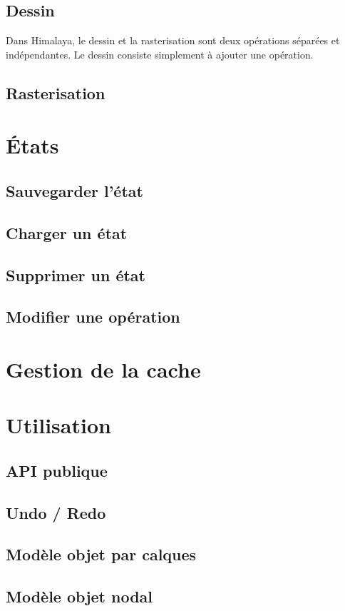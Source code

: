 		\subsection{Dessin}
		Dans Himalaya, le dessin et la rasterisation sont deux opérations séparées et indépendantes. Le dessin consiste simplement à ajouter une opération.

			
		\subsection{Rasterisation}
	\section{États}
		\subsection{Sauvegarder l'état}
		\subsection{Charger un état}
		\subsection{Supprimer un état}
		\subsection{Modifier une opération}
	\section{Gestion de la cache}
	\section{Utilisation}
		\subsection{API publique}
		\subsection{Undo / Redo}
		\subsection{Modèle objet par calques}
		\subsection{Modèle objet nodal}
